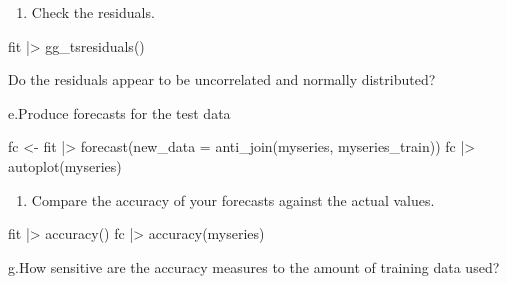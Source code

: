 \documentclass[
  11pt,
]{article}
\newenvironment{Shaded}{\begin{snugshade}}{\end{snugshade}}
\newcommand{\NormalTok}[1]{\textcolor[rgb]{0.00,0.23,0.31}{#1}}
\providecommand{\tightlist}{%
  \setlength{\itemsep}{0pt}\setlength{\parskip}{0pt}}\usepackage{longtable,booktabs,array}
\begin{document}
\begin{enumerate}
\def\labelenumi{\alph{enumi}.}
\setcounter{enumi}{3}
\tightlist
\item
  Check the residuals.
\end{enumerate}

\begin{Shaded}
\begin{Highlighting}[]
\NormalTok{fit |\textgreater{} gg\_tsresiduals()}
\end{Highlighting}
\end{Shaded}

Do the residuals appear to be uncorrelated and normally distributed?

e.Produce forecasts for the test data

\begin{Shaded}
\begin{Highlighting}[]
\NormalTok{fc \textless{}{-} fit |\textgreater{}}
\NormalTok{  forecast(new\_data = anti\_join(myseries, myseries\_train))}
\NormalTok{fc |\textgreater{} autoplot(myseries)}
\end{Highlighting}
\end{Shaded}

\begin{enumerate}
\def\labelenumi{\alph{enumi}.}
\setcounter{enumi}{5}
\tightlist
\item
  Compare the accuracy of your forecasts against the actual values.
\end{enumerate}

\begin{Shaded}
\begin{Highlighting}[]
\NormalTok{fit |\textgreater{} accuracy()}
\NormalTok{fc |\textgreater{} accuracy(myseries)}
\end{Highlighting}
\end{Shaded}

g.How sensitive are the accuracy measures to the amount of training data
used?
\end{document}
